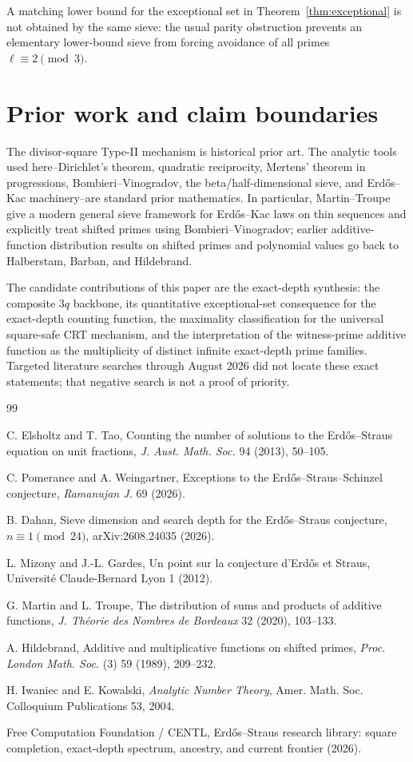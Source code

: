 \documentclass[11pt]{article}
\theoremstyle{definition}
\begin{document}
A matching lower bound for the exceptional set in Theorem~\ref{thm:exceptional} is not obtained by the same sieve: the usual parity obstruction prevents an elementary lower-bound sieve from forcing avoidance of all primes $\ell\equiv2\pmod3$.

\section{Prior work and claim boundaries}
The divisor-square Type-II mechanism is historical prior art. The analytic tools used here--Dirichlet's theorem, quadratic reciprocity, Mertens' theorem in progressions, Bombieri--Vinogradov, the beta/half-dimensional sieve, and Erd\H{o}s--Kac machinery--are standard prior mathematics. In particular, Martin--Troupe give a modern general sieve framework for Erd\H{o}s--Kac laws on thin sequences and explicitly treat shifted primes using Bombieri--Vinogradov; earlier additive-function distribution results on shifted primes and polynomial values go back to Halberstam, Barban, and Hildebrand.

The candidate contributions of this paper are the exact-depth synthesis: the composite $3q$ backbone, its quantitative exceptional-set consequence for the exact-depth counting function, the maximality classification for the universal square-safe CRT mechanism, and the interpretation of the witness-prime additive function as the multiplicity of distinct infinite exact-depth prime families. Targeted literature searches through August 2026 did not locate these exact statements; that negative search is not a proof of priority.

\begin{thebibliography}{99}

C. Elsholtz and T. Tao,
Counting the number of solutions to the Erd\H{o}s--Straus equation on unit fractions,
\emph{J. Aust. Math. Soc.} 94 (2013), 50--105.

C. Pomerance and A. Weingartner,
Exceptions to the Erd\H{o}s--Straus--Schinzel conjecture,
\emph{Ramanujan J.} 69 (2026).

B. Dahan,
Sieve dimension and search depth for the Erd\H{o}s--Straus conjecture, $n\equiv1\pmod{24}$,
arXiv:2608.24035 (2026).

L. Mizony and J.-L. Gardes,
Un point sur la conjecture d'Erd\H{o}s et Straus,
Universit\'e Claude-Bernard Lyon 1 (2012).

G. Martin and L. Troupe,
The distribution of sums and products of additive functions,
\emph{J. Th\'eorie des Nombres de Bordeaux} 32 (2020), 103--133.

A. Hildebrand,
Additive and multiplicative functions on shifted primes,
\emph{Proc. London Math. Soc.} (3) 59 (1989), 209--232.

H. Iwaniec and E. Kowalski,
\emph{Analytic Number Theory},
Amer. Math. Soc. Colloquium Publications 53, 2004.

Free Computation Foundation / CENTL,
Erd\H{o}s--Straus research library: square completion, exact-depth spectrum, ancestry, and current frontier (2026).

\end{thebibliography}
\end{document}
